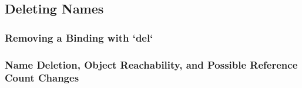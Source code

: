 \subsection{Deleting Names}
\subsubsection{Removing a Binding with `del`}
\subsubsection{Name Deletion, Object Reachability, and Possible Reference Count Changes}

